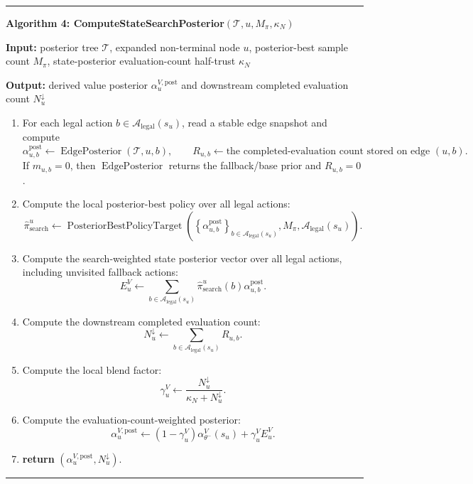 \documentclass[11pt]{article}
\newcommand{\Tree}{\mathcal{T}}
\newcommand{\Legal}{\mathcal{A}_{\mathrm{legal}}}
\newcommand{\EdgePosterior}{\operatorname{EdgePosterior}}
\newcommand{\PosteriorBestPolicyTarget}{\operatorname{PosteriorBestPolicyTarget}}
\newenvironment{algorithmblock}[1]
{
  \par\medskip
  \noindent\hrule\par\smallskip
  \noindent\textbf{#1}
  \par\smallskip
}
{
  \par\smallskip\noindent\hrule\par\medskip
}
\newcommand{\Input}{\textbf{Input: }}
\newcommand{\Output}{\textbf{Output: }}
\newcommand{\Return}{\textbf{return }}
\begin{document}
\begin{algorithmblock}{Algorithm 4: ComputeStateSearchPosterior\((\Tree,u,M_\pi,\kappa_N)\)}

\Input posterior tree \(\Tree\), expanded non-terminal node \(u\), posterior-best sample count \(M_\pi\), state-posterior evaluation-count half-trust \(\kappa_N\)

\Output derived value posterior \(\alpha^{V,\mathrm{post}}_u\) and downstream completed evaluation count \(N^\downarrow_u\)

\begin{enumerate}[leftmargin=2em]
  \item For each legal action \(b\in\Legal(s_u)\), read a stable edge snapshot and compute
  \[
  \alpha^{\mathrm{post}}_{u,b}
  \gets
  \EdgePosterior(\Tree,u,b),
  \qquad
  R_{u,b}
  \gets
  \text{the completed-evaluation count stored on edge }(u,b).
  \]
  If \(m_{u,b}=0\), then \(\EdgePosterior\) returns the fallback/base prior and
  \(R_{u,b}=0\).

  \item Compute the local posterior-best policy over all legal actions:
  \[
  \hat\pi_{\mathrm{search}}^u
  \gets
  \PosteriorBestPolicyTarget
  \left(
  \left\{\alpha^{\mathrm{post}}_{u,b}\right\}_{b\in\Legal(s_u)},
  M_\pi,
  \Legal(s_u)
  \right).
  \]

  \item Compute the search-weighted state posterior vector over all legal actions,
  including unvisited fallback actions:
  \[
  E^V_u
  \gets
  \sum_{b\in\Legal(s_u)}
  \hat\pi_{\mathrm{search}}^u(b)
  \alpha^{\mathrm{post}}_{u,b}.
  \]

  \item Compute the downstream completed evaluation count:
  \[
  N^\downarrow_u
  \gets
  \sum_{b\in\Legal(s_u)}R_{u,b}.
  \]

  \item Compute the local blend factor:
  \[
  \gamma^V_u
  \gets
  \frac{N^\downarrow_u}{\kappa_N+N^\downarrow_u}.
  \]

  \item Compute the evaluation-count-weighted posterior:
  \[
  \alpha^{V,\mathrm{post}}_u
  \gets
  (1-\gamma^V_u)\alpha_{\theta^-}^V(s_u)
  +
  \gamma^V_u E^V_u.
  \]

  \item \Return \((\alpha^{V,\mathrm{post}}_u,N^\downarrow_u)\).
\end{enumerate}

\end{algorithmblock}
\end{document}

